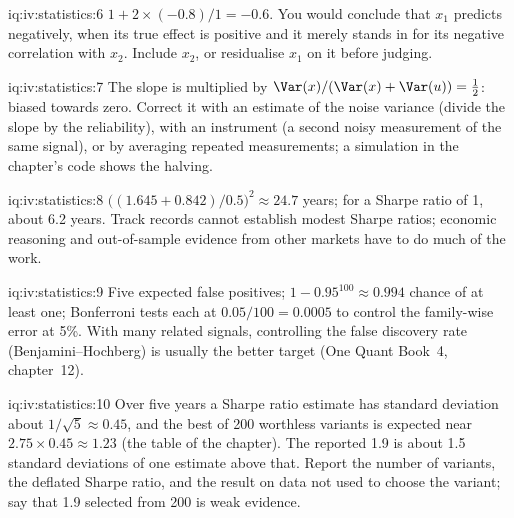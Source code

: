 \begin{solution}{iq:iv:statistics:6}
$1 + 2 \times (-0.8)/1 = -0.6$. You would conclude that $x_1$ predicts negatively, when its true effect is positive
and it merely stands in for its negative correlation with $x_2$. Include $x_2$, or residualise $x_1$ on it before
judging.
\end{solution}

\begin{solution}{iq:iv:statistics:7}
The slope is multiplied by $\Var(x)/(\Var(x) + \Var(u)) = \tfrac12$: biased towards zero. Correct it with an estimate of
the noise variance (divide the slope by the reliability), with an instrument (a second noisy measurement of the same
signal), or by averaging repeated measurements; a simulation in the chapter's code shows the halving.
\end{solution}

\begin{solution}{iq:iv:statistics:8}
$\big((1.645 + 0.842)/0.5\big)^2 \approx 24.7$ years; for a Sharpe ratio of 1, about 6.2 years. Track records cannot
establish modest Sharpe ratios; economic reasoning and out-of-sample evidence from other markets have to do much of the
work.
\end{solution}

\begin{solution}{iq:iv:statistics:9}
Five expected false positives; $1 - 0.95^{100} \approx 0.994$ chance of at least one; Bonferroni tests each at $0.05/100 =
0.0005$ to control the family-wise error at 5\%. With many related signals, controlling the false discovery rate
(Benjamini--Hochberg) is usually the better target (One Quant Book~4, chapter~12).
\end{solution}

\begin{solution}{iq:iv:statistics:10}
Over five years a Sharpe ratio estimate has standard deviation about $1/\sqrt5 \approx 0.45$, and the best of 200
worthless variants is expected near $2.75 \times 0.45 \approx 1.23$ (the table of the chapter). The reported 1.9 is
about 1.5 standard deviations of one estimate above that. Report the number of variants, the deflated Sharpe ratio,
and the result on data not used to choose the variant; say that 1.9 selected from 200 is weak evidence.
\end{solution}

